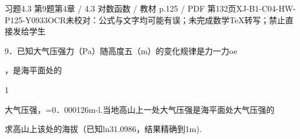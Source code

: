 \begin{bankitem}{习题4.3 第9题}{第4章 / 4.3 对数函数 / 教材 p.125 / PDF 第132页}{XJ-B1-C04-HW-P125-Y0933}{OCR未校对：公式与文字均可能有误；未完成数学TeX转写；禁止直接发给学生}
\begin{ocrdraft}
\par
9．已知大气压强力（Pa）随高度五（m）的变化规律是力一力oe
\par
，是海平面处的
\par
1
\par
大气压强，=0．000126m-l.当地高山上一处大气压强是海平面处大气压强的
\par
求高山上该处的海拔（已知ln31.0986，结果精确到1m).
\end{ocrdraft}
\end{bankitem}
